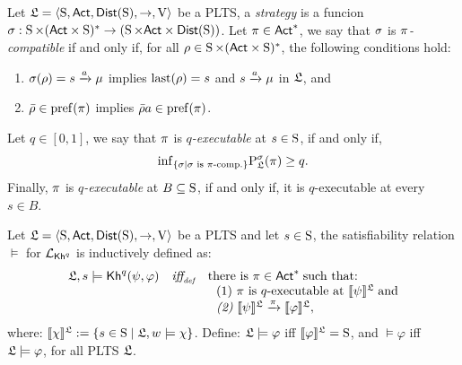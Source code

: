 \begin{definition}\label{def:strategy-comp-exec}
    Let $\model=\tup{\S,\ACT,\dist(\S),\ra,\V}$ be a PLTS, a \emph{strategy} is a funcion $\strategy: \S\times(\ACT\times\S)^* \ra (\S\times\ACT\times\dist(\S))$. Let $\plan\in\ACT^*$, we say that $\strategy$ is \emph{$\plan$-compatible} if and only if, for all $\rho\in \S\times(\ACT\times\S)^*$, the following conditions hold:
    \begin{enumerate}
        \item $\strategy(\rho)= s \reach{a} \mu$ implies $\last(\rho)=s$ and $s\reach{a}\mu$ in $\model$, and 
        \item $\bar{\rho}\in\pref(\plan)$ implies $\bar{\rho}a\in\pref(\plan)$.
    \end{enumerate}
    Let $q\in[0,1]$, we say that $\plan$ is \emph{$q$-executable} at $s\in\S$, if and only if, 
    \[
        \infim_{\{\strategy \mid \strategy \text{ is } \plan\text{-comp.}\}} \probability^\strategy_\model(\plan)\geq q.
    \]
    Finally, $\plan$ is \emph{$q$-executable} at $B\subseteq\S$, if and only if, it is $q$-executable at every $s\in B$.
\end{definition}

\begin{definition}
    Let $\model = \tup{\S,\ACT,\dist(\S),\ra,\V}$ be a PLTS and let $s\in\S$, the satisfiability relation $\models$ for $\PKh$ is inductively defined as:
    \[
        \begin{array}{l@{\ \ \ }c@{\ \ \  }l}
        \model, s \models \kh^q(\psi,\varphi) & \iffdef & \text{there is } \plan \in \ACT^* \;\text{such that:} \\
        & & \ \ \text{\rm (1)} \ \plan \text{ is $q$-executable at }  \truthset{\model}{\psi}\; \text{and} \\
        & & \ \ \text{\em (2)} \ \truthset{\model}{\psi} \reach{\plan} \truthset{\model}{\varphi}, 
        \end{array}
        \] 
        where: $\truthset{\model}{\chi} := \csetsc{s\in\S}{\model,w\models\chi}$. Define: $\model\models\varphi$ iff  $\truthset{\model}{\varphi}=\S$, and $\models\varphi$ iff $\model\models\varphi$, for all PLTS $\model$.
\end{definition}

